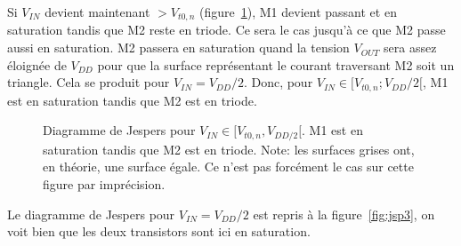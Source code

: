 \documentclass[frenchb,DIV=14]{scrartcl}
\begin{document}
Si $V_{IN}$ devient maintenant $> V_{t0,n}$ (figure~\ref{fig:jps2}), M1 devient passant et en saturation
tandis que M2 reste en triode. Ce sera le cas jusqu'à ce que M2 passe aussi en
saturation. M2 passera en saturation quand la tension $V_{OUT}$ sera assez éloignée de $V_{DD}$
pour que la surface représentant le courant traversant M2 soit un triangle. Cela se produit
pour $V_{IN} = V_{DD}/2$. Donc, pour $V_{IN} \in [V_{t0,n}; V_{DD}/2[$,
M1 est en saturation tandis que M2 est en triode.

\begin{figure}[ht]
	\centering
	\caption{Diagramme de Jespers pour $V_{IN} \in [V_{t0,n}, V_{DD/2}[$. M1 est en
	saturation tandis que M2 est en triode. Note: les surfaces grises ont, en théorie,
	une surface égale. Ce n'est pas forcément le cas sur cette figure par imprécision.}
	\label{fig:jps2}
\end{figure}

Le diagramme de Jespers pour $V_{IN} = V_{DD}/2$ est repris à la figure~\ref{fig:jsp3}, on
voit bien que les deux transistors sont ici en saturation.
\end{document}
